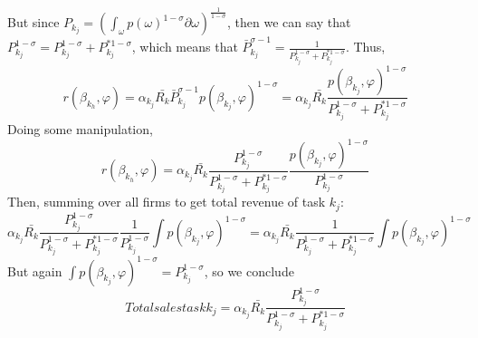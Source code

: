 \documentclass[12pt]{article}
\begin{document}
But since $P_{k_j}=\left ( \int_\omega p(\omega) ^{1-\sigma} \partial \omega \right)^{\frac{1}{1-\sigma}}$, then we can say that $P_{k_j}^{1-\sigma}=P_{k_j}^{1-\sigma}+P_{k_j}^{*1-\sigma}$, which means that $\bar{P}_{k_j}^{\sigma-1}=\frac{1}{P_{k_j}^{1-\sigma}+P_{k_j}^{*1-\sigma}}$. Thus,
$$r(\beta_{k_h},\varphi)=\alpha_{k_j}\bar{R_k}\bar{P}_{k_j}^{\sigma-1}p(\beta_{k_j},\varphi)^{1-\sigma}=\alpha_{k_j}\bar{R_k}\frac{p(\beta_{k_j},\varphi)^{1-\sigma}}{P_{k_j}^{1-\sigma}+P_{k_j}^{*1-\sigma}}$$ 
Doing some manipulation,
$$r(\beta_{k_h},\varphi)=\alpha_{k_j}\bar{R_k}\frac{P_{k_j}^{1-\sigma}}{P_{k_j}^{1-\sigma}+P_{k_j}^{*1-\sigma}}\frac{p(\beta_{k_j},\varphi)^{1-\sigma}}{P_{k_j}^{1-\sigma}}$$
Then, summing over all firms to get total revenue of task $k_j$:
$$\alpha_{k_j}\bar{R_k}\frac{P_{k_j}^{1-\sigma}}{P_{k_j}^{1-\sigma}+P_{k_j}^{*1-\sigma}} \frac{1}{{P_{k_j}^{1-\sigma}}}\int p(\beta_{k_j},\varphi)^{1-\sigma}=\alpha_{k_j}\bar{R_k}\frac{1}{P_{k_j}^{1-\sigma}+P_{k_j}^{*1-\sigma}} \int p(\beta_{k_j},\varphi)^{1-\sigma}$$
But again $\int p(\beta_{k_j},\varphi)^{1-\sigma}=P_{k_j}^{1-\sigma}$, so we conclude
$$Total sales task k_j=\alpha_{k_j}\bar{R_k}\frac{P_{k_j}^{1-\sigma}}{P_{k_j}^{1-\sigma}+P_{k_j}^{*1-\sigma}} $$
\end{document}
